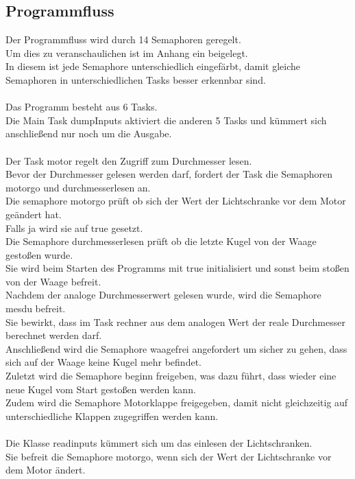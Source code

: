 \subsection{Programmfluss}
Der Programmfluss wird durch 14 Semaphoren geregelt.\\
Um dies zu veranschaulichen ist im Anhang ein  beigelegt.\\
In diesem ist jede Semaphore unterschiedlich eingefärbt, damit gleiche Semaphoren in unterschiedlichen Tasks besser erkennbar sind.\\
\\
Das Programm besteht aus 6 Tasks.\\
Die Main Task dumpInputs aktiviert die anderen 5 Tasks und kümmert sich anschließend nur noch um die Ausgabe.\\
\\
Der Task motor regelt den Zugriff zum Durchmesser lesen.\\
Bevor der Durchmesser gelesen werden darf, fordert der Task die Semaphoren motorgo und durchmesserlesen an.\\
Die semaphore motorgo prüft ob sich der Wert der Lichtschranke vor dem Motor geändert hat.\\
Falls ja wird sie auf true gesetzt.\\
Die Semaphore durchmesserlesen prüft ob die letzte Kugel von der Waage gestoßen wurde.\\
Sie wird beim Starten des Programms mit true initialisiert und sonst beim stoßen von der Waage befreit.\\
Nachdem der analoge Durchmesserwert gelesen wurde, wird die Semaphore mesdu befreit.\\
Sie bewirkt, dass im Task rechner aus dem analogen Wert der reale Durchmesser berechnet werden darf.\\
Anschließend wird die Semaphore waagefrei angefordert um sicher zu gehen, dass sich auf der Waage keine Kugel mehr befindet.\\
Zuletzt wird die Semaphore beginn freigeben, was dazu führt, dass wieder eine neue Kugel vom Start gestoßen werden kann.\\
Zudem wird die Semaphore Motorklappe freigegeben, damit nicht gleichzeitig auf unterschiedliche Klappen zugegriffen werden kann.\\
\\
Die Klasse readinputs kümmert sich um das einlesen der Lichtschranken.\\
Sie befreit die Semaphore motorgo, wenn sich der Wert der Lichtschranke vor dem Motor ändert.\\
